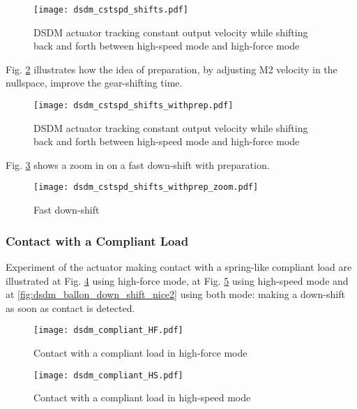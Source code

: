 \begin{figure}[htp]
	\centering
		\texttt{[image: dsdm\_cstspd\_shifts.pdf]}
	\caption[DSDM actuator tracking constant output velocity: shifts]{DSDM actuator tracking constant output velocity while shifting back and forth between high-speed mode and high-force mode }
	\label{fig:dsdm_cstspd_shifts}
\end{figure}

Fig. \ref{fig:dsdm_cstspd_shifts_withprep} illustrates how the idea of preparation, by adjusting M2 velocity in the nullspace, improve the gear-shifting time. 

\begin{figure}[htp]
	\centering
		\texttt{[image: dsdm\_cstspd\_shifts\_withprep.pdf]}
	\caption[DSDM actuator tracking constant output velocity: preparation]{DSDM actuator tracking constant output velocity while shifting back and forth between high-speed mode and high-force mode }
	\label{fig:dsdm_cstspd_shifts_withprep}
\end{figure}

Fig. \ref{fig:dsdm_cstspd_shifts_withprep_zoom} shows a zoom in on a fast down-shift with preparation. 

\begin{figure}[htp]
	\centering
		\texttt{[image: dsdm\_cstspd\_shifts\_withprep\_zoom.pdf]}
	\caption{ Fast down-shift }
	\label{fig:dsdm_cstspd_shifts_withprep_zoom}
\end{figure}

\subsubsection{Contact with a Compliant Load}

Experiment of the actuator making contact with a spring-like compliant load are illustrated at Fig. \ref{fig:dsdm_compliant_HF} using high-force mode, at Fig. \ref{fig:dsdm_compliant_HS} using high-speed mode and at \ref{fig:dsdm_ballon_down_shift_nice2} using both mode: making a down-shift as soon as contact is detected. 

\begin{figure}[htp]
	\centering
		\texttt{[image: dsdm\_compliant\_HF.pdf]}
	\caption{ Contact with a compliant load in high-force mode }
	\label{fig:dsdm_compliant_HF}
\end{figure}

\begin{figure}[htp]
	\centering
		\texttt{[image: dsdm\_compliant\_HS.pdf]}
	\caption{ Contact with a compliant load in high-speed mode }
	\label{fig:dsdm_compliant_HS}
\end{figure}

